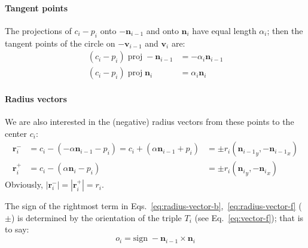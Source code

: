 \documentclass{article}
\begin{document}
\paragraph{Tangent points}
%
The projections of $c_{i}-p_{i}$ onto $-\mathbf{n}_{i-1}$ and onto $\mathbf{n}_{i}$ have equal length $\alpha_i$; then the tangent points of the circle on $-\mathbf{v}_{i-1}$ and $\mathbf{v}_{i}$ are:
%
\begin{align}
  \label{eq:alpha-vector-b}
  \left(c_{i}-p_{i}\right)\;\mathrm{proj}\; -\mathbf{n}_{i-1} &= -\alpha_i\mathbf{n}_{i-1}\\
  \label{eq:alpha-vector-f}
  \left(c_{i}-p_{i}\right)\;\mathrm{proj}\; \mathbf{n}_{i} &= \alpha_i\mathbf{n}_{i}
\end{align}
%
\paragraph{Radius vectors}
%
We are also interested in the (negative) radius vectors from these points to the center $c_{i}$:
%
\begin{align}
  \label{eq:radius-vector-b}
  \mathbf{r}^{-}_{i} &= c_{i} - \left(-\alpha\mathbf{n}_{i-1} - p_{i}\right)=c_{i} + \left(\alpha\mathbf{n}_{i-1} + p_{i}\right)&=\pm r_i\left({\mathbf{n}_{i-1}}_{y},  -{\mathbf{n}_{i-1}}_{x} \right)\\
  \label{eq:radius-vector-f}
  \mathbf{r}^{+}_{i} &= c_{i} - \left(\alpha\mathbf{n}_{i} - p_{i}\right)&=\pm r_i\left(  {\mathbf{n}_{i}}_{y}, -{\mathbf{n}_{i}}_{x} \right)
\end{align}
%
Obviously, $\left|\mathbf{r}^{-}_{i}\right| = \left|\mathbf{r}^{+}_{i}\right| = r_{i}$.

The sign of the rightmost term in Eqs.~\eqref{eq:radius-vector-b},~\eqref{eq:radius-vector-f} ($\pm$) is determined by the orientation of the triple $T_i$ (see Eq.~\eqref{eq:vector-f}); that is to say:
%
\begin{equation}
  \label{eq:orientation}
  o_i = \mathrm{sign}\; -\mathbf{n}_{i-1} \times \mathbf{n}_{i}
\end{equation}
%
\end{document}
